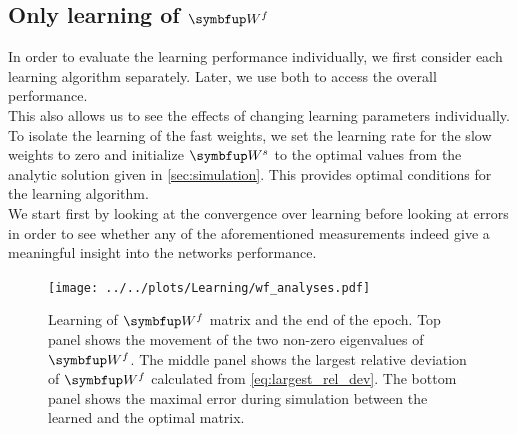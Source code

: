 \subsection{Only learning of $\bmu{W}^f$}\label{ssec:Wf_res}
In order to evaluate the learning performance individually, we first consider each learning algorithm separately. Later, we use both to access the overall performance.\\
This also allows us to see the effects of changing learning parameters individually. To isolate the learning of the fast weights, we set the learning rate for the slow weights to zero and initialize $\bmu{W}^s$ to the optimal values from the analytic solution given in \cref{sec:simulation}. This provides optimal conditions for the learning algorithm.\\
We start first by looking at the convergence over learning before looking at errors in order to see whether any of the aforementioned measurements indeed give a meaningful insight into the networks performance.\\

\begin{figure}
	\centering
	\texttt{[image: ../../plots/Learning/wf\_analyses.pdf]}
	\caption{Learning of $\bmu{W}^f$ matrix and the end of the epoch. Top panel shows the movement of the two non-zero eigenvalues of $\bmu{W}^f$. The middle panel shows the largest relative deviation of $\bmu{W}^f$ calculated from \cref{eq:largest_rel_dev}. The bottom panel shows the maximal error during simulation between the learned and the optimal matrix.}
	\label{fig:wf_analyses}
\end{figure}


